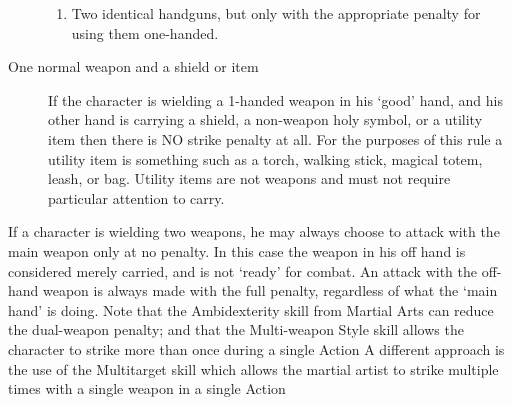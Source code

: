 \documentclass[twoside]{book}
\begin{document}
\begin{description}
\begin{enumerate}
                    
  \item 
                       Two identical handguns, but only with the
                       appropriate penalty for using them one-handed.
                       
                    
\end{enumerate}
    
                
  \item[ One normal weapon and a shield or item
                   ]   If the character is wielding a 1-handed weapon
                   in his `good' hand, and his other hand is
                   carrying a shield, a non-weapon holy symbol, or a
                   utility item then there is NO strike penalty at all.
                   For the purposes of this rule a utility item is
                   something such as a torch, walking stick, magical
                   totem, leash, or bag. Utility items are not weapons
                   and must not require particular attention to carry.
                   
\end{description}
   If a character is wielding two weapons, he may
               always choose to attack with the main weapon only at no
               penalty. In this case the weapon in his off hand is
               considered merely carried, and is not `ready'
               for combat. An attack with the off-hand weapon is always
               made with the full penalty, regardless of what the
               `main hand' is doing.  Note that the Ambidexterity skill from Martial Arts
               can reduce the dual-weapon penalty; and that the
               Multi-weapon Style skill allows the character to strike
               more than once during a single Action A different approach
               is the use of the Multitarget skill which allows the
               martial artist to strike multiple times with a single
               weapon in a single Action 
    
\end{document}
